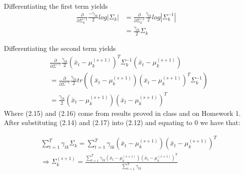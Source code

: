 \documentclass[paper=a4, fontsize=11pt]{scrartcl} %
\numberwithin{equation}{section} %
\numberwithin{figure}{section} %
\numberwithin{table}{section} %
\begin{document}
Differentiating the first term yields
\begin{align}
\frac{\partial}{\partial \Sigma^{-1}_{k}}\frac{-\gamma_{tk}}{2}log|\Sigma_k|
&=\frac{\partial}{\partial \Sigma^{-1}_{k}}\frac{\gamma_{tk}}{2}log|\Sigma^{-1}_k|\\
&=\frac{\gamma_{tk}}{2}\Sigma_k
\end{align}

Differentiating the second term yields
\begin{align}
&\frac{\partial}{\partial \Sigma^{-1}}\frac{\gamma_{tk}}{2}\left(\bar{x}_t-\mu_k^{(s+1)}\right)^T\Sigma_k^{-1}\left(\bar{x}_t-\mu_k^{(s+1)}\right)\\
&=\frac{\partial}{\partial \Sigma^{-1}}\frac{\gamma_{tk}}{2}tr\left(\left(\bar{x}_t-\mu_k^{(s+1)}\right)\left(\bar{x}_t-\mu_k^{(s+1)}\right)^T\Sigma_k^{-1}\right)\\
&= \frac{\gamma_{tk}}{2}\left(\bar{x}_t-\mu_k^{(s+1)}\right)\left(\bar{x}_t-\mu_k^{(s+1)}\right)^T
\end{align}
Where (2.15) and (2.16) come from results proved in class and on Homework 1. After substituting (2.14) and (2.17) into (2.12) and equating to 0 we have that:

\begin{align}
&\sum_{t=1}^{T}\gamma_{tk}\Sigma_k=\sum_{t=1}^{T}
\gamma_{tk}\left(\bar{x}_t-\mu_k^{(s+1)}\right)\left(\bar{x}_t-\mu_k^{(s+1)}\right)^T\\
&\Rightarrow \Sigma_k^{(s+1)} = \frac{\sum_{t=1}^{T}\gamma_{tk}(\bar{x}_t-\mu_k^{(s+1)})(\bar{x}_t-\mu_k^{(s+1)})^T}{\sum_{t=1}^{T}\gamma_{tk}}
\end{align}
\end{document}
